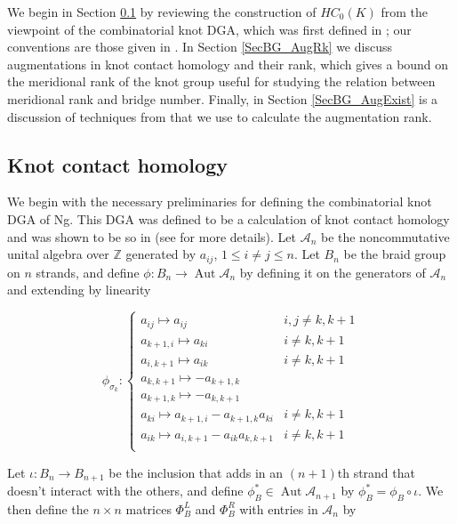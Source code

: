 \documentclass[11pt]{amsart}
\def\Z{{\mathbb Z}}
\def\A{{\mathcal A}}
\def\s{{\sigma}}
\newcommand\Aut{\operatorname{Aut}}
\begin{document}
  We begin in Section \ref{SecBG_KCHdef} by reviewing the construction of $HC_0(K)$ from the viewpoint of the combinatorial knot DGA, which was first defined in \cite{Ng08}; our conventions are those given in \cite{Ng12}. In Section \ref{SecBG_AugRk} we discuss augmentations in knot contact homology and their rank, which gives a bound on the meridional rank of the knot group useful for studying the relation between meridional rank and bridge number. Finally, in Section \ref{SecBG_AugExist} is a discussion of techniques from \cite{Cor13b} that we use to calculate the augmentation rank.

\subsection{Knot contact homology}
\label{SecBG_KCHdef}

  We begin with the necessary preliminaries for defining the combinatorial knot DGA of Ng. This DGA was defined to be a calculation of knot contact homology and was shown to be so in \cite{EENS12} (see \cite{Ng12} for more details). Let $\A_n$ be the noncommutative unital algebra over $\Z$ generated by $a_{ij}$, $1\le i\ne j\le n$.  Let $B_n$ be the braid group on $n$ strands, and define $\phi : B_n \rightarrow\Aut \A_n$ by defining it on the generators of $\A_n$ and extending by linearity

  \begin{equation}
  \phi_{\s_k}\colon
  \left\{
       \begin{array}{lr}
         a_{ij}\mapsto a_{ij} & i,j\ne k,k+1\\
         a_{k+1,i}\mapsto a_{ki} & i\ne k,k+1\\
         a_{i,k+1}\mapsto a_{ik} & i\ne k,k+1\\
         a_{k,k+1}\mapsto -a_{k+1,k} & \\
         a_{k+1,k}\mapsto -a_{k,k+1} & \\
         a_{ki}\mapsto a_{k+1,i} - a_{k+1,k}a_{ki} & i\ne k,k+1\\
         a_{ik}\mapsto a_{i,k+1} - a_{ik}a_{k,k+1} & i\ne k,k+1\\
       \end{array}
  \right.
  \label{DefnPhiMap}
  \end{equation}

  Let $\iota\colon B_n \rightarrow B_{n+1}$ be the inclusion that adds in an $(n+1)$th strand that doesn't interact with the others, and define $\phi_B^*\in \Aut \A_{n+1}$ by $\phi_B^* = \phi_B\circ\iota$.  We then define the $n\times n$ matrices $\Phi_B^L$ and $\Phi_B^R$ with entries in $\A_n$ by
\end{document}
